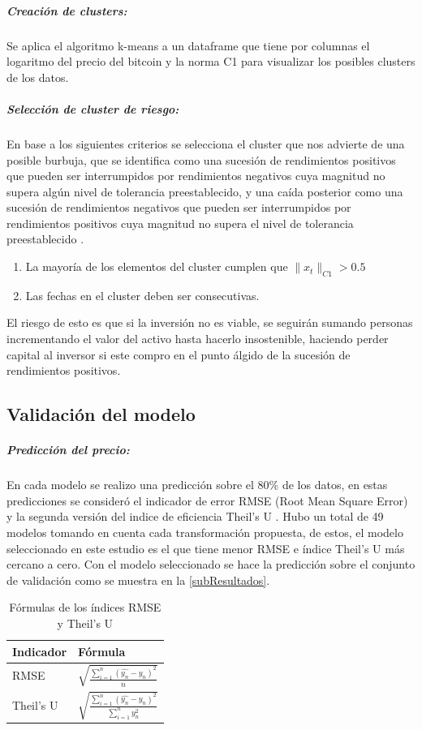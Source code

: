 \subparagraph{Creación de clusters:} Se aplica el algoritmo k-means a un dataframe que tiene por columnas el logaritmo del precio del bitcoin y la norma C1 para visualizar los posibles clusters de los datos.
\subparagraph{Selección de cluster de riesgo:} En base a los siguientes criterios se selecciona el cluster que nos advierte de una posible burbuja, que se identifica como una sucesión de rendimientos positivos que pueden ser interrumpidos por rendimientos negativos cuya magnitud no supera algún nivel de tolerancia preestablecido, y una caída posterior como una sucesión de rendimientos negativos que pueden ser interrumpidos por rendimientos positivos cuya magnitud no supera el nivel de tolerancia preestablecido \cite{gideaTopologicalRecognitionCritical2020}. 

\begin{enumerate}
	\item La mayoría de los elementos del cluster cumplen que $\lVert x_t \rVert_{C1} > 0.5$
	\item Las fechas en el cluster deben ser consecutivas.
\end{enumerate}

El riesgo de esto es que si la inversión no es viable, se seguirán sumando personas incrementando el valor del activo hasta hacerlo insostenible, haciendo perder capital al inversor si este compro en el punto álgido de la sucesión de rendimientos positivos.

\subsection{Validación del modelo}
\subparagraph{Predicción del precio:}
En cada modelo se realizo una predicción sobre el 80\% de los datos, en estas predicciones se consideró el indicador de error RMSE (Root Mean Square Error) y la segunda versión del indice de eficiencia Theil’s U \cite{bliemelTheilForecastAccuracy1973}.
Hubo un total de 49 modelos tomando en cuenta cada transformación propuesta, de estos, el modelo seleccionado en este estudio es el que tiene menor RMSE e índice Theil’s U más cercano a cero. Con el modelo seleccionado se hace la predicción sobre el conjunto de validación como se muestra en la \autoref{subResultados}.

\begin{table}[H]
	\centering
	{
		\begin{tabular}{ll}
			\toprule
			\textbf{Indicador} & \textbf{Fórmula}\\
			\midrule
			RMSE			&$\sqrt{\frac{\sum_{i=1}^{n}({\hat{y_{n}}} - y_{n})^{2}}{n}}$\\ 
			Theil’s U 	&$\sqrt{\frac{\sum_{i=1}^{n}({\hat{y_{n}}} - y_{n})^{2}}{\sum_{i=1}^{n}y_{n}^{2}}}$ \\
			
			\bottomrule
			\hline
	\end{tabular}} \quad
	\caption{Fórmulas de los índices RMSE y Theil’s U}
	\label{tab:Table12}
\end{table}

